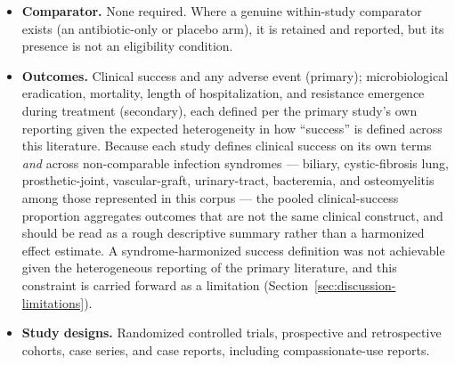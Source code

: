 \begin{itemize}
We record what this criterion costs. Beyond the two adjudications above, this review does \emph{not} extract the phage preparation itself --- not the product or its constituent phages, not titre, not dose, not schedule, not duration, and not whether the preparation was personalised or pre-made. The pooled proportions therefore treat a single-phage personalised preparation and a multi-phage commercial cocktail as the same exposure, which they are not. This is a genuine limitation of the review and not only of the literature, and it is the reason no dose- or product-stratified analysis appears below; the corresponding gap in the primary sources --- how rarely they report whether the phage was active on the organism at all --- is quantified in Section~\ref{sec:results-synthesis} and carried into the certainty assessment as indirectness.
\item \textbf{Comparator.} None required. Where a genuine within-study comparator exists (an antibiotic-only or placebo arm), it is retained and reported, but its presence is not an eligibility condition.
\item \textbf{Outcomes.} Clinical success and any adverse event (primary); microbiological eradication, mortality, length of hospitalization, and resistance emergence during treatment (secondary), each defined per the primary study's own reporting given the expected heterogeneity in how ``success'' is defined across this literature. Because each study defines clinical success on its own terms \emph{and} across non-comparable infection syndromes --- biliary, cystic-fibrosis lung, prosthetic-joint, vascular-graft, urinary-tract, bacteremia, and osteomyelitis among those represented in this corpus --- the pooled clinical-success proportion aggregates outcomes that are not the same clinical construct, and should be read as a rough descriptive summary rather than a harmonized effect estimate. A syndrome-harmonized success definition was not achievable given the heterogeneous reporting of the primary literature, and this constraint is carried forward as a limitation (Section~\ref{sec:discussion-limitations}).
\item \textbf{Study designs.} Randomized controlled trials, prospective and retrospective cohorts, case series, and case reports, including compassionate-use reports.
\end{itemize}

